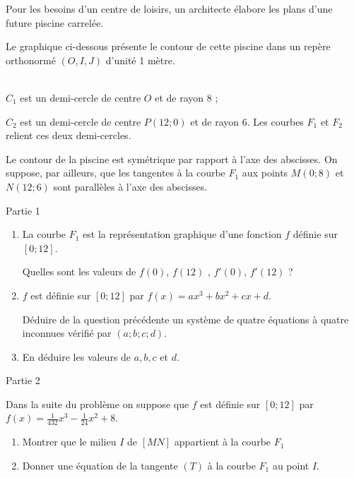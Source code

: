 
%
Pour les besoins d'un centre de loisirs, un architecte élabore les plans d'une future piscine carrelée.
\par
Le graphique ci-dessous présente le contour de cette piscine dans un repère orthonormé $(O,I,J)$ d'unité 1 mètre.
\begin{center}
\end{center}
\\
$C_1$ est un demi-cercle de centre $O$ et de rayon $8$ ;
\par
$C_2$ est un demi-cercle de centre $P(12 ; 0)$ et de rayon $6$. Les courbes $F_1$ et $F_2$ relient ces deux demi-cercles.
\par
Le contour de la piscine est symétrique par rapport à l'axe des abscisses. On suppose, par ailleurs, que les tangentes à la courbe $F_1$ aux points $M(0;8)$ et $N(12;6)$ sont parallèles à l'axe des abscisses.
\begin{h3}Partie 1\end{h3}
\begin{enumerate}
     \item
     La courbe $F_1$ est la représentation graphique d'une fonction $f$ définie sur $[0;12]$.
     \par
     Quelles sont les valeurs de $f(0)$,  $f(12)$ ,  $f'(0)$,  $f'(12)$ ?
     \item
     $f$ est définie sur $[0;12]$ par $f(x)=ax^3+bx^2+cx+d$.
     \par
     Déduire de la question précédente un système de quatre équations à quatre inconnues vérifié par $(a;b;c;d)$.
     \item
     En déduire les valeurs de $a, b, c$ et $d$.
\end{enumerate}
\begin{h3}Partie 2\end{h3}
Dans la suite du problème on suppose que $f$ est définie sur $[0;12]$ par $f(x)=\frac{1}{432}x^3-\frac{1}{24}x^2+8$.
\begin{enumerate}
     \item
     Montrer que le milieu $I$ de $[MN]$ appartient à la courbe $F_1$
     \item
     Donner une équation de la tangente $(T)$  à la courbe $F_1$ au point $I$.
\end{enumerate}
